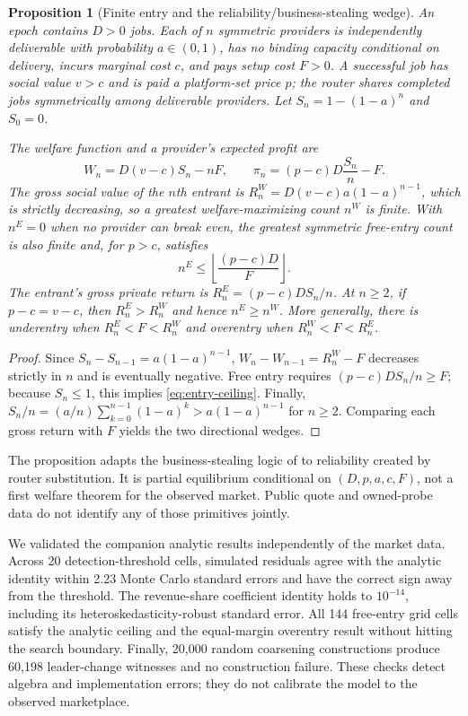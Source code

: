 \documentclass[11pt]{article}
\newcommand{\1}{\mathbf{1}}
\newtheorem{proposition}{Proposition}
\begin{document}
\begin{proposition}[Finite entry and the reliability/business-stealing wedge]
\label{prop:free-entry}
An epoch contains $D>0$ jobs.  Each of $n$ symmetric providers is independently
deliverable with probability $a\in(0,1)$, has no binding capacity conditional on
delivery, incurs marginal cost $c$, and pays setup cost $F>0$.  A successful job
has social value $v>c$ and is paid a platform-set price $p$; the router shares
completed jobs symmetrically among deliverable providers.  Let
$S_n=1-(1-a)^n$ and $S_0=0$.

The welfare function and a provider's expected profit are
\begin{equation}
 W_n=D(v-c)S_n-nF,
 \qquad
 \pi_n=(p-c)D\frac{S_n}{n}-F.
 \label{eq:entry-welfare-profit}
\end{equation}
The gross social value of the $n$th entrant is
$R_n^W=D(v-c)a(1-a)^{n-1}$, which is strictly decreasing, so a greatest
welfare-maximizing count $n^W$ is finite.  With $n^E=0$ when no provider can
break even, the greatest symmetric free-entry count is also finite and, for
$p>c$, satisfies
\begin{equation}
 n^E\leq \left\lfloor\frac{(p-c)D}{F}\right\rfloor.
 \label{eq:entry-ceiling}
\end{equation}
The entrant's gross private return is $R_n^E=(p-c)DS_n/n$.  At $n\geq2$, if
$p-c=v-c$, then $R_n^E>R_n^W$ and hence $n^E\geq n^W$.  More generally, there is
underentry when $R_n^E<F<R_n^W$ and overentry when $R_n^W<F<R_n^E$.
\end{proposition}

\begin{proof}
Since $S_n-S_{n-1}=a(1-a)^{n-1}$,
$W_n-W_{n-1}=R_n^W-F$ decreases strictly in $n$ and is eventually negative.
Free entry requires $(p-c)DS_n/n\geq F$; because $S_n\leq1$, this implies
\cref{eq:entry-ceiling}.  Finally,
$S_n/n=(a/n)\sum_{k=0}^{n-1}(1-a)^k>a(1-a)^{n-1}$ for $n\geq2$.
Comparing each gross return with $F$ yields the two directional wedges.
\end{proof}

The proposition adapts the business-stealing logic of
\citet{mankiw1986freeentry} to reliability created by router substitution.  It is
partial equilibrium conditional on $(D,p,a,c,F)$, not a first welfare theorem for
the observed market.  Public quote and owned-probe data do not identify any of
those primitives jointly.

We validated the companion analytic results independently of the market data.
Across 20 detection-threshold cells, simulated residuals agree with the analytic
identity within 2.23 Monte Carlo standard errors and have the correct sign away
from the threshold.  The revenue-share coefficient identity holds to
$10^{-14}$, including its heteroskedasticity-robust standard error.  All 144
free-entry grid cells satisfy the analytic ceiling and the equal-margin
overentry result without hitting the search boundary.  Finally, 20,000 random
coarsening constructions produce 60,198 leader-change witnesses and no
construction failure.  These checks detect algebra and implementation errors;
they do not calibrate the model to the observed marketplace.
\end{document}
